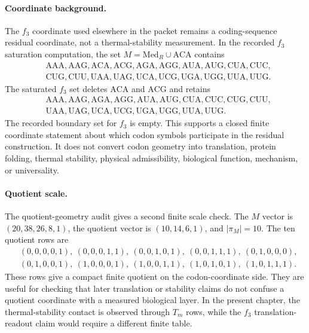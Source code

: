 \paragraph{Coordinate background.}
The $f_3$ coordinate used elsewhere in the packet remains a coding-sequence residual coordinate, not a thermal-stability measurement.  In the recorded $f_3$ saturation computation, the set $M=\mathrm{Med}_{R}\cup\mathrm{ACA}$ contains
$$
\begin{aligned}
&\mathrm{AAA},\mathrm{AAG},\mathrm{ACA},\mathrm{ACG},\mathrm{AGA},\mathrm{AGG},\mathrm{AUA},\mathrm{AUG},\mathrm{CUA},\mathrm{CUC},\\
&\mathrm{CUG},\mathrm{CUU},\mathrm{UAA},\mathrm{UAG},\mathrm{UCA},\mathrm{UCG},\mathrm{UGA},\mathrm{UGG},\mathrm{UUA},\mathrm{UUG}.
\end{aligned}
$$
The saturated $f_3$ set deletes $\mathrm{ACA}$ and $\mathrm{ACG}$ and retains
$$
\begin{aligned}
&\mathrm{AAA},\mathrm{AAG},\mathrm{AGA},\mathrm{AGG},\mathrm{AUA},\mathrm{AUG},\mathrm{CUA},\mathrm{CUC},\mathrm{CUG},\mathrm{CUU},\\
&\mathrm{UAA},\mathrm{UAG},\mathrm{UCA},\mathrm{UCG},\mathrm{UGA},\mathrm{UGG},\mathrm{UUA},\mathrm{UUG}.
\end{aligned}
$$
The recorded boundary set for $f_3$ is empty.  This supports a closed finite coordinate statement about which codon symbols participate in the residual construction.  It does not convert codon geometry into translation, protein folding, thermal stability, physical admissibility, biological function, mechanism, or universality.

\paragraph{Quotient scale.}
The quotient-geometry audit gives a second finite scale check.  The $M$ vector is $(20,38,26,8,1)$, the quotient vector is $(10,14,6,1)$, and $|\pi_M|=10$.  The ten quotient rows are
$$
\begin{aligned}
&(0,0,0,0,1),\ (0,0,0,1,1),\ (0,0,1,0,1),\ (0,0,1,1,1),\ (0,1,0,0,0),\\
&(0,1,0,0,1),\ (1,0,0,0,1),\ (1,0,0,1,1),\ (1,0,1,0,1),\ (1,0,1,1,1).
\end{aligned}
$$
These rows give a compact finite quotient on the codon-coordinate side.  They are useful for checking that later translation or stability claims do not confuse a quotient coordinate with a measured biological layer.  In the present chapter, the thermal-stability contact is observed through $T_m$ rows, while the $f_3$ translation-readout claim would require a different finite table.

